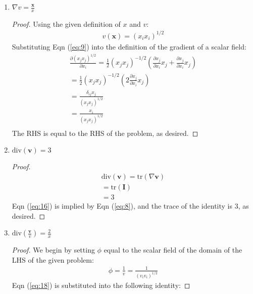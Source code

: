 \begin{enumerate}
        \item $\nabla v=\frac{\mathbf{x}}{x}$
        \begin{proof}
                Using the given definition of $x$ and $v$:
            \begin{align}
                v(\mathbf{x})=(x_{i}x_{i})^{1/2}\label{eq:9}
                \end{align}
            Substituting Eqn (\ref{eq:9}) into the definition of the gradient of a scalar field:
            \begin{align}
                \frac{ \partial (x_{j}x_{j})^{1/2} }{ \partial x_{i} } =\frac{1}{2}(x_{j}x_{j})^{-1/2}\left( \frac{ \partial x_{j} }{ \partial x_{i} } x_{j} +\frac{ \partial x_{j} }{ \partial x_{i} } x_{j}\right) \\
                =\frac{1}{2}(x_{j}x_{j})^{-1/2}\left( 2\frac{ \partial x_j }{ \partial x_{i} } x_{j} \right) \\
                =\frac{\delta_{ij}x_{j}}{(x_{j}x_{j})^{1/2}} \\
                =\frac{x_{i}}{(x_{j}x_{j})^{1/2}} \\
            \end{align}
        The RHS is equal to the RHS of the problem, as desired.
        \end{proof}
        \pagebreak
        \item $\text{div}(\mathbf{v})=3$
        \begin{proof}
            \begin{align}
                \text{div}(\mathbf{v})=\text{tr}(\nabla \mathbf{v}) \label{eq:15}\\
                =\text{tr}(\mathbf{I}) \label{eq:16} \\
                =3
                \end{align}
                Eqn (\ref{eq:16}) is implied by Eqn (\ref{eq:8}), and the trace of the identity is $3$, as desired.
        \end{proof}
        \item $\text{div}\left( \frac{\mathbf{v}}{v} \right)=\frac{2}{x}$
        \begin{proof}
            We begin by setting $\phi$ equal to the scalar field of the domain of the LHS of the given problem:
            \begin{align}
                \phi=\frac{1}{v} =\frac{1}{(v_{i}v_{i})^{1/2}} \label{eq:18}
                \end{align}
            Eqn (\ref{eq:18}) is substituted into the following identity:

\end{proof}
\end{enumerate}
